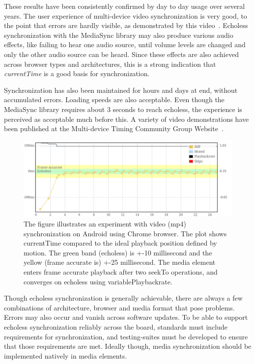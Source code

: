 These results have been consistently confirmed by day to day usage over
several years. The user experience of multi-device video synchronization is
very good, to the point that errors are hardly visible, as demonstrated by
this video~\cite{carneval}. Echoless synchronization with the MediaSync
library may also produce various audio effects, like failing to hear one audio
source, until volume levels are changed and only the other audio source can be
heard. Since these effects are also achieved across browser types and
architectures, this is a strong indication that \emph{currentTime} is a good
basis for synchronization.

Synchronization has also been maintained for hours and days at end, without
accumulated errors. Loading speeds are also acceptable. Even though the
MediaSync library requires about 3 seconds to reach echoless, the experience
is perceived as acceptable much before this. A variety of video demonstrations
have been published at the Multi-device Timing Community Group
Website~\cite{mtcg}.

\begin{figure}[h]
\centering
\includegraphics[scale=.23]{fig/android-video.png}
\caption{The figure illustrates an experiment with video (mp4) synchronization on
Android using Chrome browser. The plot shows currentTime compared to the ideal
playback position defined by motion. The green band (echoless) is +-10 millisecond and
the yellow (frame accurate is) +-25 millisecond. The media element enters frame accurate
playback after two seekTo operations, and converges on echoless using
variablePlaybackrate.}
\label{fig:videosync}
\end{figure}

Though echoless synchronization is generally achievable, there are always a
few combinations of architecture, browser and media format that pose problems.
Errors may also occur and vanish across software updates. To be able to
support echoless synchronization reliably across the board, standards must
include requirements for synchronization, and testing-suites must be developed
to ensure that those requirements are met. Ideally though, media
synchronization should be implemented natively in media elements.


